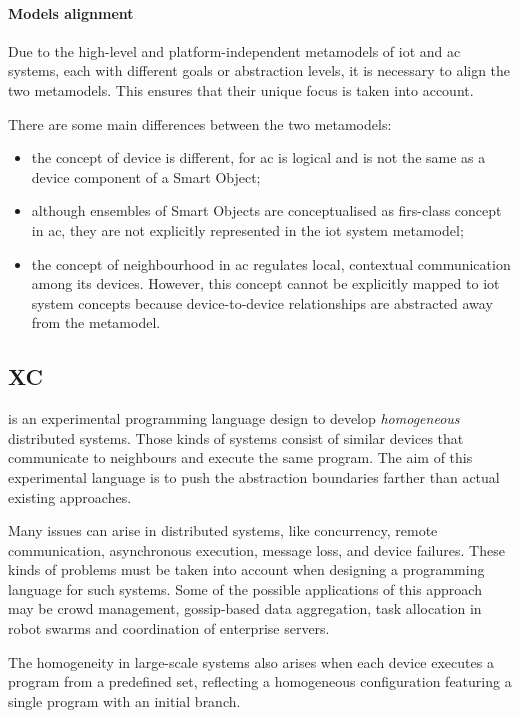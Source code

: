 \paragraph{Models alignment}
Due to the high-level and platform-independent metamodels of \ac{iot} and \ac{ac} systems, each with different goals or
abstraction levels, it is necessary to align the two metamodels.
This ensures that their unique focus is taken into account.

There are some main differences between the two metamodels:
\begin{itemize}
    \item the concept of device is different, for \ac{ac} is logical and is not the same as a device component of a Smart Object;
    \item although ensembles of Smart Objects are conceptualised as firs-class concept in \ac{ac}, they are not explicitly
        represented in the \ac{iot} system metamodel;
    \item the concept of neighbourhood in \ac{ac} regulates local, contextual communication among its devices.
        However, this concept cannot be explicitly mapped to \ac{iot} system concepts because device-to-device relationships
        are abstracted away from the metamodel.
\end{itemize}

\subsection{XC}
\label{subsec:xc}
\xc{} is an experimental programming language design to develop \emph{homogeneous} distributed systems.
Those kinds of systems consist of similar devices that communicate to neighbours and execute the same program.
The aim of this experimental language is to push the abstraction boundaries farther than actual existing approaches.

Many issues can arise in distributed systems, like concurrency, remote communication, asynchronous execution, message
loss, and device failures.
These kinds of problems must be taken into account when designing a programming language for such systems.
Some of the possible applications of this approach may be crowd management, gossip-based data aggregation, task allocation
in robot swarms and coordination of enterprise servers. %

The homogeneity in large-scale systems also arises when each device executes a program from a predefined set, reflecting
a homogeneous configuration featuring a single program with an initial branch.

